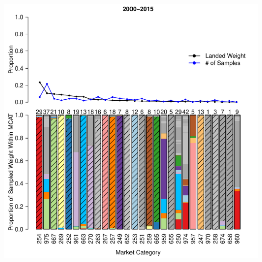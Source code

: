 \documentclass[ xcolor = pdftex, dvipsnames, table ]{beamer}
\begin{document}
\subsection{}
\begin{frame}
\centering
\includegraphics[height=\textheight]{../pictures/2000to2015Bar3.pdf}

\end{frame}
\end{document}

